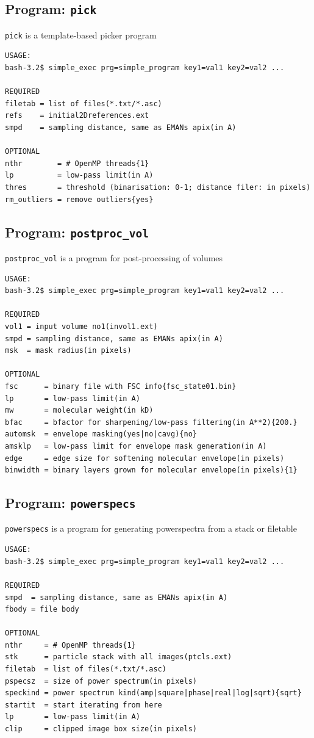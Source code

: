 \documentclass[a4paper,11pt]{article}
\newcommand{\prgname}[1]{\textcolor{NavyBlue}{\texttt{#1}}}
\begin{document}
\subsection{Program: \prgname{pick}}
\label{pick}
\prgname{pick} is a template-based picker program

\begin{verbatim}
USAGE:
bash-3.2$ simple_exec prg=simple_program key1=val1 key2=val2 ...

REQUIRED
filetab = list of files(*.txt/*.asc)
refs    = initial2Dreferences.ext
smpd    = sampling distance, same as EMANs apix(in A)

OPTIONAL
nthr        = # OpenMP threads{1}
lp          = low-pass limit(in A)
thres       = threshold (binarisation: 0-1; distance filer: in pixels)
rm_outliers = remove outliers{yes}
\end{verbatim}

\subsection{Program: \prgname{postproc\_vol}}
\label{postproc_vol}
\prgname{postproc\_vol} is a program for post-processing of volumes

\begin{verbatim}
USAGE:
bash-3.2$ simple_exec prg=simple_program key1=val1 key2=val2 ...

REQUIRED
vol1 = input volume no1(invol1.ext)
smpd = sampling distance, same as EMANs apix(in A)
msk  = mask radius(in pixels)

OPTIONAL
fsc      = binary file with FSC info{fsc_state01.bin}
lp       = low-pass limit(in A)
mw       = molecular weight(in kD)
bfac     = bfactor for sharpening/low-pass filtering(in A**2){200.}
automsk  = envelope masking(yes|no|cavg){no}
amsklp   = low-pass limit for envelope mask generation(in A)
edge     = edge size for softening molecular envelope(in pixels)
binwidth = binary layers grown for molecular envelope(in pixels){1}
\end{verbatim}

\subsection{Program: \prgname{powerspecs}}
\label{powerspecs}
\prgname{powerspecs} is a program for generating powerspectra from a stack or filetable

\begin{verbatim}
USAGE:
bash-3.2$ simple_exec prg=simple_program key1=val1 key2=val2 ...

REQUIRED
smpd  = sampling distance, same as EMANs apix(in A)
fbody = file body

OPTIONAL
nthr     = # OpenMP threads{1}
stk      = particle stack with all images(ptcls.ext)
filetab  = list of files(*.txt/*.asc)
pspecsz  = size of power spectrum(in pixels)
speckind = power spectrum kind(amp|square|phase|real|log|sqrt){sqrt}
startit  = start iterating from here
lp       = low-pass limit(in A)
clip     = clipped image box size(in pixels)
\end{verbatim}
\end{document}
